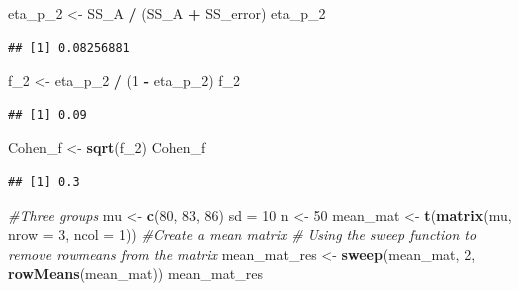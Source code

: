 \documentclass[
]{book}
\newenvironment{Shaded}{\begin{snugshade}}{\end{snugshade}}
\newcommand{\CommentTok}[1]{\textcolor[rgb]{0.56,0.35,0.01}{\textit{#1}}}
\newcommand{\DataTypeTok}[1]{\textcolor[rgb]{0.13,0.29,0.53}{#1}}
\newcommand{\DecValTok}[1]{\textcolor[rgb]{0.00,0.00,0.81}{#1}}
\newcommand{\KeywordTok}[1]{\textcolor[rgb]{0.13,0.29,0.53}{\textbf{#1}}}
\newcommand{\NormalTok}[1]{#1}
\newcommand{\OperatorTok}[1]{\textcolor[rgb]{0.81,0.36,0.00}{\textbf{#1}}}
\newcommand{\StringTok}[1]{\textcolor[rgb]{0.31,0.60,0.02}{#1}}
\begin{document}
\begin{Shaded}
\begin{Highlighting}[]
\NormalTok{eta_p_}\DecValTok{2}\NormalTok{ <-}\StringTok{ }\NormalTok{SS_A }\OperatorTok{/}\StringTok{ }\NormalTok{(SS_A }\OperatorTok{+}\StringTok{ }\NormalTok{SS_error)}
\NormalTok{eta_p_}\DecValTok{2}
\end{Highlighting}
\end{Shaded}

\begin{verbatim}
## [1] 0.08256881
\end{verbatim}

\begin{Shaded}
\begin{Highlighting}[]
\NormalTok{f_}\DecValTok{2}\NormalTok{ <-}\StringTok{ }\NormalTok{eta_p_}\DecValTok{2} \OperatorTok{/}\StringTok{ }\NormalTok{(}\DecValTok{1} \OperatorTok{-}\StringTok{ }\NormalTok{eta_p_}\DecValTok{2}\NormalTok{)}
\NormalTok{f_}\DecValTok{2}
\end{Highlighting}
\end{Shaded}

\begin{verbatim}
## [1] 0.09
\end{verbatim}

\begin{Shaded}
\begin{Highlighting}[]
\NormalTok{Cohen_f <-}\StringTok{ }\KeywordTok{sqrt}\NormalTok{(f_}\DecValTok{2}\NormalTok{)}
\NormalTok{Cohen_f}
\end{Highlighting}
\end{Shaded}

\begin{verbatim}
## [1] 0.3
\end{verbatim}

\begin{Shaded}
\begin{Highlighting}[]
\CommentTok{#Three groups}
\NormalTok{mu <-}\StringTok{ }\KeywordTok{c}\NormalTok{(}\DecValTok{80}\NormalTok{, }\DecValTok{83}\NormalTok{, }\DecValTok{86}\NormalTok{)}
\NormalTok{sd =}\StringTok{ }\DecValTok{10}
\NormalTok{n <-}\StringTok{ }\DecValTok{50}
\NormalTok{mean_mat <-}\StringTok{ }\KeywordTok{t}\NormalTok{(}\KeywordTok{matrix}\NormalTok{(mu,}
\DataTypeTok{nrow =} \DecValTok{3}\NormalTok{,}
\DataTypeTok{ncol =} \DecValTok{1}\NormalTok{)) }\CommentTok{#Create a mean matrix}
\CommentTok{# Using the sweep function to remove rowmeans from the matrix}
\NormalTok{mean_mat_res <-}\StringTok{ }\KeywordTok{sweep}\NormalTok{(mean_mat, }\DecValTok{2}\NormalTok{, }\KeywordTok{rowMeans}\NormalTok{(mean_mat))}
\NormalTok{mean_mat_res}
\end{Highlighting}
\end{Shaded}
\end{document}
